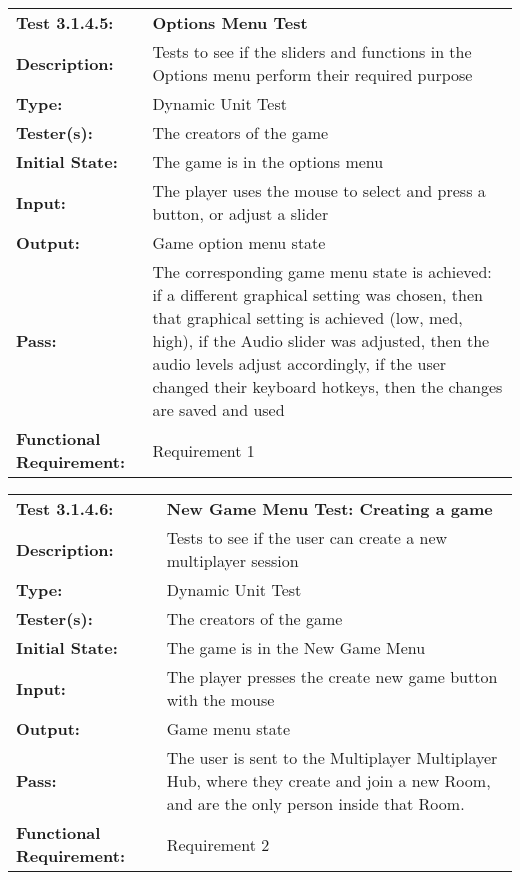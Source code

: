 \documentclass[12pt, titlepage]{article}
\begin{document}
\begin{mdframed}[linewidth=1pt]
\begin{tabularx}{\textwidth}{@{}p{3cm}X@{}}
{\bf Test 3.1.4.5:} & {\bf Options Menu Test}\\[\baselineskip]
{\bf Description:} & Tests to see if the sliders and functions in the Options menu perform their required purpose\\[0.5\baselineskip]
{\bf Type:} & Dynamic Unit Test\\[0.5\baselineskip]
{\bf Tester(s):} & The creators of the game\\[0.5\baselineskip]
{\bf Initial State:} & The game is in the options menu\\[0.5\baselineskip]
{\bf Input:} & The player uses the mouse to select and press a button, or adjust a slider \\[0.5\baselineskip]
{\bf Output:} & Game option menu state\\[0.5\baselineskip]
{\bf Pass:} & The corresponding game menu state is achieved: if a different graphical setting was chosen, then that graphical setting is achieved (low, med, high), if the Audio slider was adjusted, then the audio levels adjust accordingly, if the user changed their keyboard hotkeys, then the changes are saved and used \\[0.5\baselineskip]
{\bf Functional Requirement:} & Requirement 1
\end{tabularx}
\end{mdframed}

\begin{mdframed}[linewidth=1pt]
\begin{tabularx}{\textwidth}{@{}p{3cm}X@{}}
{\bf Test 3.1.4.6:} & {\bf New Game Menu Test: Creating a game}\\[\baselineskip]
{\bf Description:} & Tests to see if the user can create a new multiplayer session\\[0.5\baselineskip]
{\bf Type:} & Dynamic Unit Test\\[0.5\baselineskip]
{\bf Tester(s):} & The creators of the game\\[0.5\baselineskip]
{\bf Initial State:} & The game is in the New Game Menu\\[0.5\baselineskip]
{\bf Input:} & The player presses the create new game button with the mouse \\[0.5\baselineskip]
{\bf Output:} & Game menu state\\[0.5\baselineskip]
{\bf Pass:} & The user is sent to the Multiplayer Multiplayer Hub, where they create and join a new Room, and are the only person inside that Room. \\[0.5\baselineskip]
{\bf Functional Requirement:} & Requirement 2
\end{tabularx}
\end{mdframed}
\end{document}
